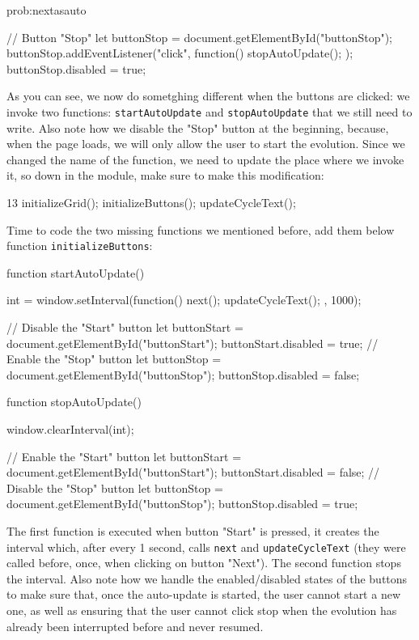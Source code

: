 \begin{sol}{prob:nextasauto}
\begin{code}
{  // Button "Stop"
  let buttonStop = document.getElementById("buttonStop");
  buttonStop.addEventListener("click", function(){
    stopAutoUpdate();
  });
  buttonStop.disabled = true;
}
\end{code}
As you can see, we now do sometghing different when the buttons are clicked: we invoke two functions: 
\texttt{startAutoUpdate} and \texttt{stopAutoUpdate} that we still need to write. Also note how we
disable the "Stop" button at the beginning, because, when the page loads, we will only allow the user
to start the evolution.
Since we changed the name of the function, we need to update the place where we invoke it, so down in the module,
make sure to make this modification:
\begin{codeh1}{1}{3}
initializeGrid();
initializeButtons();
updateCycleText();
\end{codeh1}
Time to code the two missing functions we mentioned before, add them below function \texttt{initializeButtons}:
\begin{code}
function startAutoUpdate() {
  int = window.setInterval(function(){
    next();
    updateCycleText();
  }, 1000);

  // Disable the "Start" button
  let buttonStart = document.getElementById("buttonStart");
  buttonStart.disabled = true;
  // Enable the "Stop" button
  let buttonStop = document.getElementById("buttonStop");
  buttonStop.disabled = false;
}

function stopAutoUpdate() {
  window.clearInterval(int);

  // Enable the "Start" button
  let buttonStart = document.getElementById("buttonStart");
  buttonStart.disabled = false;
  // Disable the "Stop" button
  let buttonStop = document.getElementById("buttonStop");
  buttonStop.disabled = true;
}
\end{code}
The first function is executed when button "Start" is pressed, it creates the interval which, after every 1 second,
calls \texttt{next} and \texttt{updateCycleText} (they were called before, once, when clicking on button "Next").
The second function stops the interval. Also note how we handle the enabled/disabled states of the buttons to make
sure that, once the auto-update is started, the user cannot start a new one, as well as ensuring that the user
cannot click stop when the evolution has already been interrupted before and never resumed.
\end{sol}

